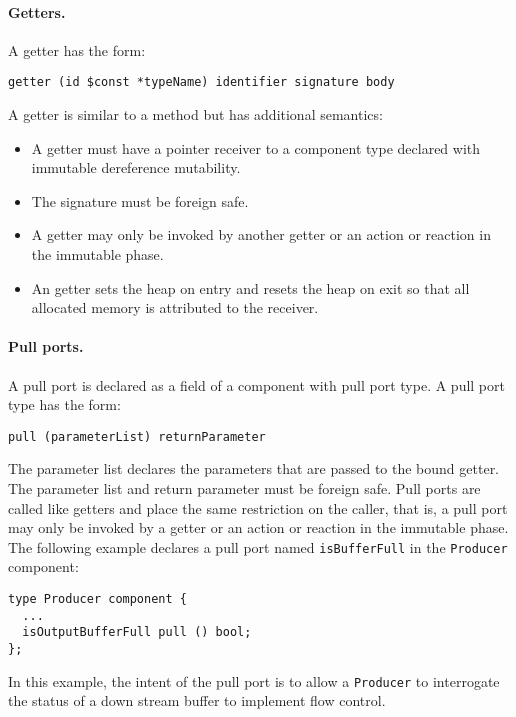 \paragraph{Getters.}
A getter has the form:
\begin{verbatim}
getter (id $const *typeName) identifier signature body
\end{verbatim}
A getter is similar to a method but has additional semantics:
\begin{itemize}
\item A getter must have a pointer receiver to a component type declared with immutable dereference mutability.
\item The signature must be foreign safe.
\item A getter may only be invoked by another getter or an action or reaction in the immutable phase.
\item An getter sets the heap on entry and resets the heap on exit so that all allocated memory is attributed to the receiver.
\end{itemize}

\paragraph{Pull ports.}
A pull port is declared as a field of a component with pull port type.
A pull port type has the form:
\begin{verbatim}
pull (parameterList) returnParameter
\end{verbatim}
The parameter list declares the parameters that are passed to the bound getter.
The parameter list and return parameter must be foreign safe.
Pull ports are called like getters and place the same restriction on the caller, that is, a pull port may only be invoked by a getter or an action or reaction in the immutable phase.
The following example declares a pull port named \verb+isBufferFull+ in the \verb+Producer+ component:
\begin{verbatim}
type Producer component {
  ...
  isOutputBufferFull pull () bool;
};
\end{verbatim}
In this example, the intent of the pull port is to allow a \verb+Producer+ to interrogate the status of a down stream buffer to implement flow control.

